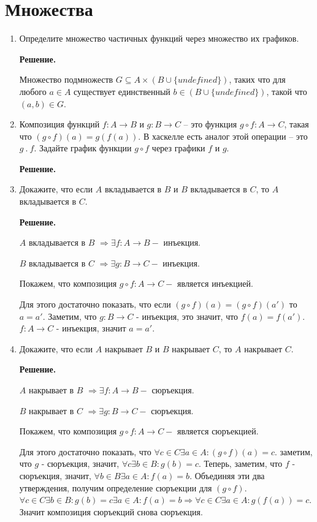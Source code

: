 \section*{Множества}
\begin{enumerate}

\item Определите множество частичных функций через множество их графиков.

\textbf{Решение.} 

Множество подмножеств $G \subseteq A \times (B \cup \{undefined\})$,
таких что для любого $a \in A$ существует единственный
$b \in (B \cup \{undefined\})$, такой что $(a, b) \in G$.

\item Композиция функций $f : A \to B$ и $g : B \to C$ -- это функция $g \circ f : A \to C$, 
такая что $(g \circ f)(a) = g(f(a))$.
    В хаскелле есть аналог этой операции -- это $g\ .\ f$.
    Задайте график функции $g \circ f$ через графики $f$ и $g$.

\textbf{Решение.} 


\item Докажите, что если $A$ вкладывается в $B$ и $B$ вкладывается в $C$, то $A$ вкладывается в $C$.

\textbf{Решение.} 

$A$ вкладывается в $B$ $\Rightarrow \exists f:A\rightarrow B - $ инъекция.

$B$ вкладывается в $C$ $\Rightarrow \exists g:B\rightarrow C - $ инъекция.

Покажем, что композиция $g \circ f : A\rightarrow C - $ является инъекцией.

Для этого достаточно показать, что если $(g \circ f)(a) = (g \circ f)(a')$ 
то $a = a'$. Заметим, что $g:B\rightarrow C$ - инъекция, это значит, что 
$f(a) = f(a')$. $f:A\rightarrow C$ - инъекция, значит $a = a'$.

\item Докажите, что если $A$ накрывает $B$ и $B$ накрывает $C$, то $A$ накрывает $C$.

\textbf{Решение.} 

$A$ накрывает в $B$ $\Rightarrow \exists f:A\rightarrow B - $ сюръекция.

$B$ накрывает в $C$ $\Rightarrow \exists g:B\rightarrow C - $ сюръекция.

Покажем, что композиция $g \circ f : A\rightarrow C - $ является 
сюръекцией.

Для этого достаточно показать, что $\forall c \in C \exists a \in A : (g 
\circ f)(a) = c$. заметим, что $g$ - сюръекция, значит, $\forall c \exists 
b \in B : g(b) = c$. Теперь, заметим, что $f$ - сюръекция, значит, 
$\forall b \in B \exists a \in A : f(a) = b$. Объединяя эти два 
утверждения, получим определение сюръекции для $(g \circ f)$. $\forall c 
\in C \exists b \in B : g(b) = c \exists a \in A : f(a) = b \Rightarrow 
\forall c \in C \exists a \in A : g(f(a)) = c$. Значит композиция 
сюръекций снова сюръекция.


\end{enumerate}
